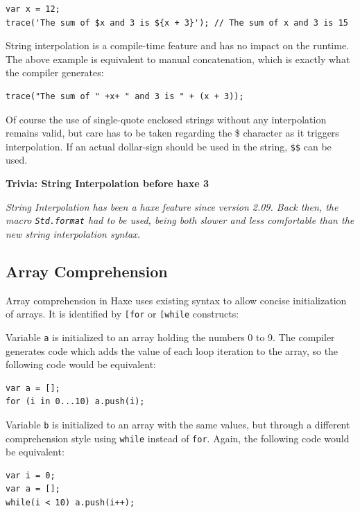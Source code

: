 \documentclass{article}
\newcommand{\expr}[1]{\texttt{#1}}
\newenvironment{myshaded}
  {\def\FrameCommand{\fboxsep=\topsep\colorbox{bgcolor}}%
  \MakeFramed {\advance\hsize-\width \FrameRestore}}%
 {\endMakeFramed}
\newcommand{\trivia}[2]
	{\begin{myshaded}\noindent\textbf{Trivia: #1}\par\nobreak\noindent\ignorespaces\textit{#2}\end{myshaded}}
\begin{document}
\begin{lstlisting}
var x = 12;
trace('The sum of $x and 3 is ${x + 3}'); // The sum of x and 3 is 15
\end{lstlisting} 
String interpolation is a compile-time feature and has no impact on the runtime. The above example is equivalent to manual concatenation, which is exactly what the compiler generates:

\begin{lstlisting}
trace("The sum of " +x+ " and 3 is " + (x + 3));
\end{lstlisting}
Of course the use of single-quote enclosed strings without any interpolation remains valid, but care has to be taken regarding the \$ character as it triggers interpolation. If an actual dollar-sign should be used in the string, \expr{\$\$} can be used.

\trivia{String Interpolation before haxe 3}{String Interpolation has been a haxe feature since version 2.09. Back then, the macro \expr{Std.format} had to be used, being both slower and less comfortable than the new string interpolation syntax.}


\subsection{Array Comprehension}
\label{Array Comprehension}

Array comprehension in Haxe uses existing syntax to allow concise initialization of arrays. It is identified by \expr{[for} or \expr{[while} constructs:



Variable \expr{a} is initialized to an array holding the numbers 0 to 9. The compiler generates code which adds the value of each loop iteration to the array, so the following code would be equivalent:

\begin{lstlisting}
var a = [];
for (i in 0...10) a.push(i);
\end{lstlisting}

Variable \expr{b} is initialized to an array with the same values, but through a different comprehension style using \expr{while} instead of \expr{for}. Again, the following code would be equivalent:

\begin{lstlisting}
var i = 0;
var a = [];
while(i < 10) a.push(i++);
\end{lstlisting}
\end{document}
